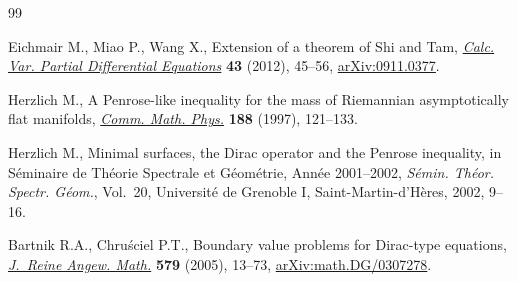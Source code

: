 \begin{thebibliography}{99}

Eichmair M., Miao P., Wang X., Extension of a theorem of {S}hi and {T}am,
 \href{https://doi.org/10.1007/s00526-011-0402-2}{\textit{Calc. Var. Partial Differential Equations}} \textbf{43} (2012),
 45--56, \href{https://arxiv.org/abs/0911.0377}{arXiv:0911.0377}.


Herzlich M., A {P}enrose-like inequality for the mass of {R}iemannian
 asymptotically flat manifolds, \href{https://doi.org/10.1007/s002200050159}{\textit{Comm. Math. Phys.}} \textbf{188}
 (1997), 121--133.


Herzlich M., Minimal surfaces, the {D}irac operator and the {P}enrose
 inequality, in S\'eminaire de {T}h\'eorie {S}pectrale et {G}\'eom\'etrie, {A}nn\'ee 2001--2002, \textit{S\'emin. Th\'eor. Spectr. G\'eom.}, Vol.~20,
 Universit\'e de Grenoble I, Saint-Martin-d'H\`eres, 2002, 9--16.


Bartnik R.A., Chru\'sciel P.T., Boundary value problems for {D}irac-type
 equations, \href{https://doi.org/10.1515/crll.2005.2005.579.13}{\textit{J.~Reine Angew. Math.}} \textbf{579} (2005), 13--73,
 \href{https://arxiv.org/abs/math.DG/0307278}{arXiv:math.DG/0307278}.


\end{thebibliography}
